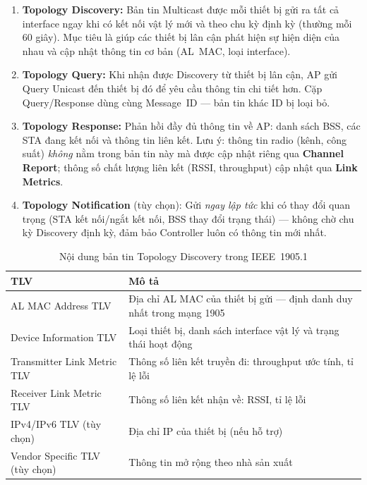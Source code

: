 \begin{enumerate}
	\item \textbf{Topology Discovery:} Bản tin Multicast được mỗi thiết bị gửi ra tất
	cả interface ngay khi có kết nối vật lý mới và theo chu kỳ định kỳ (thường
	mỗi 60 giây). Mục tiêu là giúp các thiết bị lân cận phát hiện sự hiện diện
	của nhau và cập nhật thông tin cơ bản (AL~MAC, loại interface).
	
	\item \textbf{Topology Query:} Khi nhận được Discovery từ thiết bị lân cận, AP
	gửi Query Unicast đến thiết bị đó để yêu cầu thông tin chi tiết hơn. Cặp
	Query/Response dùng cùng Message~ID --- bản tin khác ID bị loại bỏ.
	
	\item \textbf{Topology Response:} Phản hồi đầy đủ thông tin về AP: danh sách BSS,
	các STA đang kết nối và thông tin liên kết. Lưu ý: thông tin radio (kênh,
	công suất) \textit{không} nằm trong bản tin này mà được cập nhật riêng qua
	\textbf{Channel Report}; thông số chất lượng liên kết (RSSI, throughput) cập
	nhật qua \textbf{Link Metrics}.
	
	\item \textbf{Topology Notification} (tùy chọn): Gửi \textit{ngay lập tức} khi có
	thay đổi quan trọng (STA kết nối/ngắt kết nối, BSS thay đổi trạng thái) ---
	không chờ chu kỳ Discovery định kỳ, đảm bảo Controller luôn có thông tin
	mới nhất.
\end{enumerate}

\begin{table}[ht]
	\centering
	\caption{Nội dung bản tin Topology Discovery trong IEEE~1905.1}
	\begin{tabular}{|>{\raggedright\arraybackslash}m{5cm}|>{\raggedright\arraybackslash}m{8cm}|}
		\hline
		\textbf{TLV} & \textbf{Mô tả} \\
		\hline
		AL MAC Address TLV & Địa chỉ AL MAC của thiết bị gửi --- định danh duy nhất trong mạng 1905 \\
		\hline
		Device Information TLV & Loại thiết bị, danh sách interface vật lý và trạng thái hoạt động \\
		\hline
		Transmitter Link Metric TLV & Thông số liên kết truyền đi: throughput ước tính, tỉ lệ lỗi \\
		\hline
		Receiver Link Metric TLV & Thông số liên kết nhận về: RSSI, tỉ lệ lỗi \\
		\hline
		IPv4/IPv6 TLV (tùy chọn) & Địa chỉ IP của thiết bị (nếu hỗ trợ) \\
		\hline
		Vendor Specific TLV (tùy chọn) & Thông tin mở rộng theo nhà sản xuất \\
		\hline
	\end{tabular}
\end{table}


